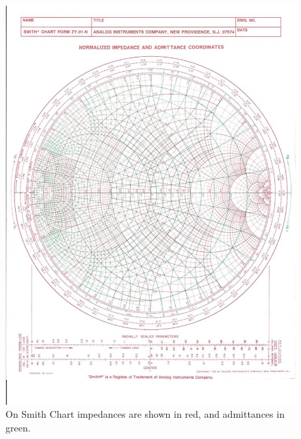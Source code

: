 \documentclass{ximera}
\begin{document}
\begin{figure}[htbp]
\begin{center}
\includegraphics[scale=0.3]{../jpg/SCadmimp.jpg}
\end{center}
\caption{On Smith Chart impedances are shown in red, and admittances in green.}
\label{scadmimp}
\end{figure}
\end{document}
